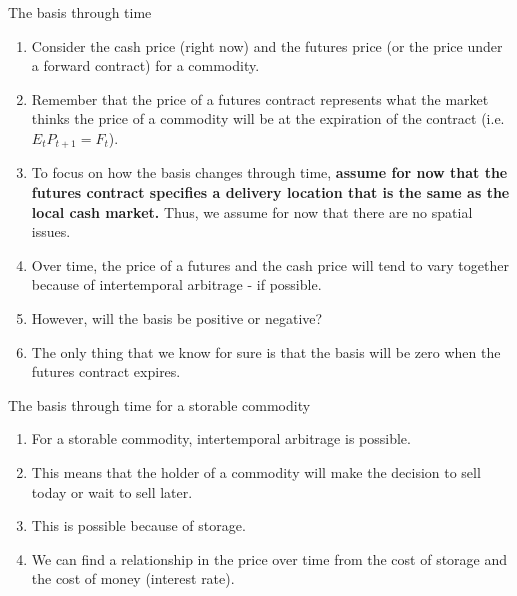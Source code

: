 \documentclass[table,xcolor=pdftex,dvipsnames, handout]{beamer}\usepackage[]{graphicx}\usepackage[]{color}
\begin{document}

\begin{frame}{The basis through time}
\begin{enumerate}[label=\textbullet]
    \item Consider the cash price (right now) and the futures price (or the price under a forward contract) for a commodity.
    \item Remember that the price of a futures contract represents what the market thinks the price of a commodity will be at the expiration of the contract (i.e. $E_t P_{t+1} = F_t$).
    \item To focus on how the basis changes through time, \textbf{assume for now that the futures contract specifies a delivery location that is the same as the local cash market.} Thus, we assume for now that there are no spatial issues.
    \item Over time, the price of a futures and the cash price will tend to vary together because of intertemporal arbitrage -  if possible.
    \item However, will the basis be positive or negative?
    \item The only thing that we know for sure is that the basis will be zero when the futures contract expires.
\end{enumerate}
\end{frame}


\begin{frame}{The basis through time for a storable commodity}
\begin{enumerate}[label=\textbullet]
    \item For a storable commodity, intertemporal arbitrage is possible.
    \item This means that the holder of a commodity will make the decision to sell today or wait to sell later.
    \item This is possible because of storage.
    \item We can find a relationship in the price over time from the cost of storage and the cost of money (interest rate).
\end{enumerate}
\end{frame}

\end{document}
